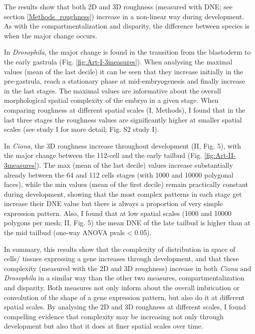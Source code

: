 The results show that both 2D and 3D roughness (measured with DNE; see section \ref{Methods_roughness}) increase in a non-linear way during development.
As with the compartmentalization and disparity, the difference between species is when the major change occurs. 

In \textit{Drosophila}, the major change is found in the transition from the blastoderm to the early gastrula (Fig. \ref{fig:Art-I-3measures}).
When analysing the maximal values (mean of the last decile) it can be seen that they increase initially in the pre-gastrula, reach a stationary phase at mid-embryogenesis and finally increase in the last stages. 
The maximal values are informative about the overall morphological spatial complexity of the embryo in a given stage.
When comparing roughness at different spatial scales (I, Methods), I found that in the last three stages the roughness values are significantly higher at smaller spatial scales (see study I for more detail; Fig. S2 study I). 

In \textit{Ciona}, the 3D roughness increase throughout development (II, Fig. 5), with the major change between the 112-cell and the early tailbud (Fig. \ref{fig:Art-II-3measures}).  
The max (mean of the last decile) values increase substantially already between the 64 and 112 cells stages (with 1000 and 10000 polygonal faces), while the min values (mean of the first decile) remain practically constant during development, showing that the most complex patterns in each stage get increase their DNE value but there is always a proportion of very simple expression pattern.
Also, I found that at low spatial scales (1000 and 10000 polygons per mesh; II, Fig. 5) the mean DNE of the late tailbud is higher than at the mid tailbud (one-way ANOVA pvals < 0.05).

In summary, this results show that the complexity of distribution in space of cells/ tissues expressing a gene increases through development, and that these complexity (measured with the 2D and 3D roughness) increase in both \textit{Ciona} and \textit{Drosophila} in a similar way than the other two measures, compartmentalization and disparity. 
Both measures not only inform about the overall imbrication or convolution of the shape of a gene expression pattern, but also do it at different spatial scales. By analysing the 2D and 3D roughness at different scales, I found compelling evidence that complexity may be increasing not only through development but also that it does at finer spatial scales over time.

